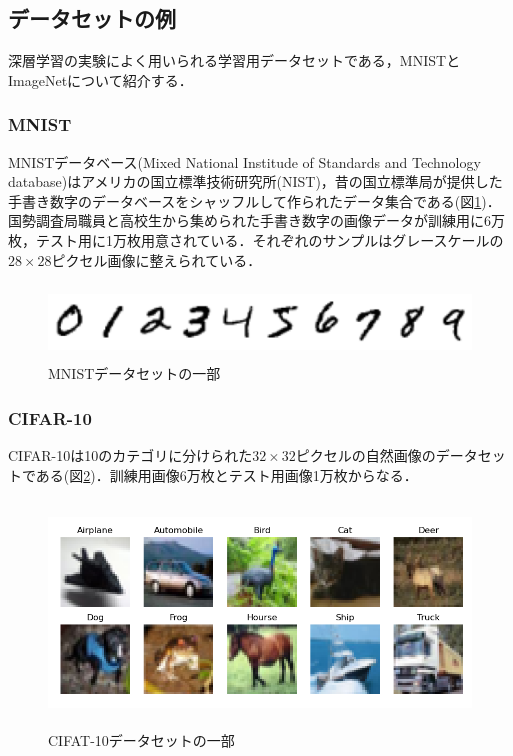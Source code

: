 \documentclass[a4paper,11pt]{jsreport}
\begin{document}
\subsection{データセットの例}
深層学習の実験によく用いられる学習用データセットである，MNISTとImageNetについて紹介する．
\subsubsection*{MNIST}
MNISTデータベース(Mixed National Institude of Standards and Technology database)はアメリカの国立標準技術研究所(NIST)，昔の国立標準局が提供した手書き数字のデータベースをシャッフルして作られたデータ集合である(図\ref{MNIST})．国勢調査局職員と高校生から集められた手書き数字の画像データが訓練用に6万枚，テスト用に1万枚用意されている．それぞれのサンプルはグレースケールの$28 \times 28$ピクセル画像に整えられている．
\begin{figure}[H]
  \begin{center}
      \includegraphics[height=2cm]{image/mnist.png}
      \caption{MNISTデータセットの一部}
      \label{MNIST}
  \end{center}
\end{figure}
\subsubsection{CIFAR-10}
CIFAR-10は10のカテゴリに分けられた$32 \times 32$ピクセルの自然画像のデータセットである(図\ref{CIFAR10})．訓練用画像6万枚とテスト用画像1万枚からなる．
\begin{figure}[H]
  \begin{center}
      \includegraphics[height=6cm]{image/CIFAR10.png}
      \caption{CIFAT-10データセットの一部}
      \label{CIFAR10}
  \end{center}
\end{figure}
\end{document}

